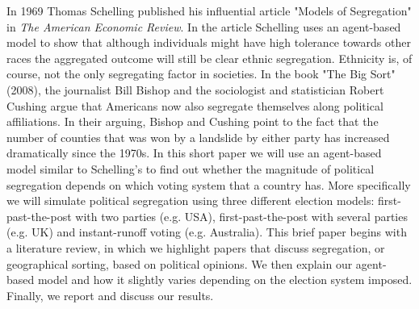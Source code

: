 \documentclass[12pt, a4paper]{article}
\begin{document}
In 1969 Thomas Schelling published his influential article "Models of Segregation" in \textit{The American Economic Review}. In the article Schelling uses an agent-based model to show that although individuals might have high tolerance towards other races the aggregated outcome will still be clear ethnic segregation. Ethnicity is, of course, not the only segregating factor in societies. In the book "The Big Sort" (2008),     the journalist Bill Bishop and the sociologist and statistician Robert Cushing argue that Americans now also segregate themselves along political affiliations. In their arguing, Bishop and Cushing point to the fact that the number of counties that was won by a landslide by either party has increased dramatically since the 1970s. 
\newline In this short paper we will use an agent-based model similar to Schelling's to find out whether the magnitude of political segregation depends on which voting system that a country has. More specifically we will simulate political segregation using three different election models: first-past-the-post with two parties (e.g. USA), first-past-the-post with several parties (e.g. UK) and instant-runoff voting (e.g. Australia). This brief paper begins with a literature review, in which we highlight papers that discuss segregation, or geographical sorting, based on political opinions. We then explain our agent-based model and how it slightly varies depending on the election system imposed. Finally, we report and discuss our results.


\end{document}
